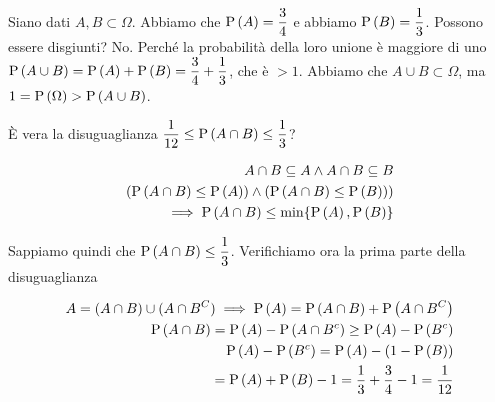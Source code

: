 \begin{exrc}
	Siano dati $A,B \subset \Omega$. Abbiamo che $ \text{P}\left(A\right) = \dfrac{3}{4} $ e abbiamo $ \text{P}\left(B\right) = \dfrac{1}{3} $. Possono essere disgiunti? No. Perché la probabilità della loro unione è maggiore di uno $ \text{P}\left(A \cup B\right) = \text{P}\left(A\right) + \text{P}\left(B\right) = \dfrac{3}{4} + \dfrac{1}{3} $, che è $ > 1 $. Abbiamo che $ A \cup B \subset \Omega $, ma $ 1 = \text{P}\left(\Omega\right) > \text{P}\left(A \cup B\right) $. 
	
	È vera la disuguaglianza $ \dfrac{1}{12} \leq \text{P}\left(A \cap B\right) \leq \dfrac{1}{3} $?
	
	\begin{equation*}
	\begin{aligned}
	A \cap B \subseteq A \land A \cap B \subseteq B \\
	(\text{P}\left(A \cap B\right) \leq \text{P}\left(A\right)) \land (\text{P}\left(A \cap B\right) \leq \text{P}\left(B\right))) \\
	\implies \text{P}\left(A \cap B\right) \leq \min\{\text{P}\left(A\right), \text{P}\left(B\right)\} \\
	\end{aligned} 
	\end{equation*}
	
	Sappiamo quindi che $ \text{P}\left(A \cap B\right) \leq \dfrac{1}{3} $. Verifichiamo ora la prima parte della disuguaglianza
	
	\begin{equation*}
	\begin{aligned}
	A = (A \cap B) \cup (A \cap B^C) \implies \text{P}\left(A\right) = \text{P}\left(A \cap B\right) + \text{P}\left(A \cap B^C\right) \\
	\text{P}\left(A \cap B\right) = \text{P}\left(A\right) - \text{P}\left(A \cap B^c\right) \geq \text{P}\left(A\right) - \text{P}\left(B^c\right) \\
	\text{P}\left(A\right) - \text{P}\left(B^c\right) = \text{P}\left(A\right) - (1-\text{P}\left(B\right)) \\ 
	= \text{P}\left(A\right) + \text{P}\left(B\right) - 1 = \dfrac{1}{3} + \dfrac{3}{4} - 1 = \dfrac{1}{12}
	\end{aligned}
	\end{equation*}
\end{exrc} 

